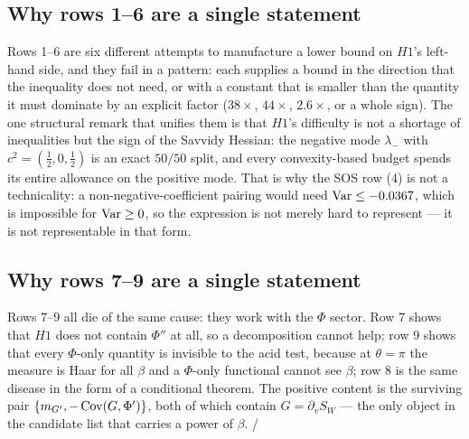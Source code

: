 \subsection{Why rows 1--6 are a single statement}

Rows 1--6 are six different attempts to manufacture a lower bound on $H1$'s left-hand side, and
they fail in a pattern: each supplies a bound in the direction that the inequality does not need,
or with a constant that is smaller than the quantity it must dominate by an explicit factor
($38\times$, $44\times$, $2.6\times$, or a whole sign). The one structural remark that unifies
them is that $H1$'s difficulty is not a shortage of inequalities but the sign of the Savvidy
Hessian: the negative mode $\lambda_-$ with $c^{2}=(\tfrac12,0,\tfrac12)$ is an exact $50/50$
split, and every convexity-based budget spends its entire allowance on the positive mode. \LN{}
That is why the SOS row (4) is not a technicality: a non-negative-coefficient pairing would need
$\operatorname{Var}\le-0.0367$, which is impossible for $\operatorname{Var}\ge0$, so the expression is not merely hard to
represent --- it is not representable in that form.


\subsection{Why rows 7--9 are a single statement}

Rows 7--9 all die of the same cause: they work with the $\Phi$ sector. Row 7 shows that $H1$ does
not contain $\Phi''$ at all, so a decomposition cannot help; row 9 shows that every $\Phi$-only
quantity is invisible to the acid test, because at $\theta=\pi$ the measure is Haar for all
$\beta$ and a $\Phi$-only functional cannot see $\beta$; row 8 is the same disease in the form of
a conditional theorem. The positive content is the surviving pair
$\{m_{G'},-\operatorname{Cov}(G,\Phi')\}$, both of which contain $G=\partial_vS_W$ --- the only object in the
candidate list that carries a power of $\beta$. \LT{}/\LN{}


